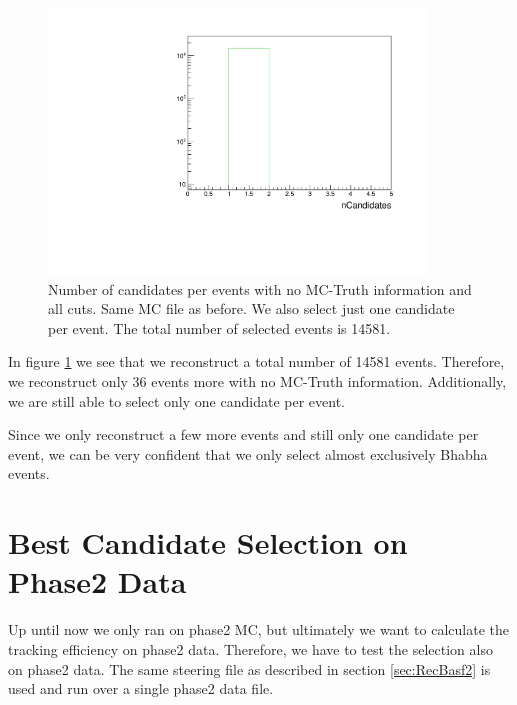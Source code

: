 \documentclass[a4paper,11pt,twosided,final,german,openbib,pdftex,listof=totoc,bibliography=totoc]{scrbook}
\begin{document}
\begin{figure}[h!]
	\centering
	\includegraphics[width=10cm]{Cuts/nCandNoMCInfo.pdf}
	\caption[Number Of Candidates Per Event With No MC-Truth Info (All Cuts)]{Number of candidates per events with no MC-Truth information and all cuts. Same MC file as before. We also select just one candidate per event. The total number of selected events is 14581.}
	\label{fig:nCandNoMCInfo}
\end{figure}

In figure \ref{fig:nCandNoMCInfo} we see that we reconstruct a total number of 14581 events. Therefore, we reconstruct only 36 events more with no MC-Truth information. Additionally, we are still able to select only one candidate per event. 

Since we only reconstruct a few more events and still only one candidate per event, we can be very confident that we only select almost exclusively Bhabha events.

\section{Best Candidate Selection on Phase2 Data}
\label{sec:SelectingBhabhaData}

Up until now we only ran on phase2 MC, but ultimately we want to calculate the tracking efficiency on phase2 data. Therefore, we have to test the selection also on phase2 data. The same steering file as described in section \ref{sec:RecBasf2} is used and run over a single phase2 data file. 
\end{document}
